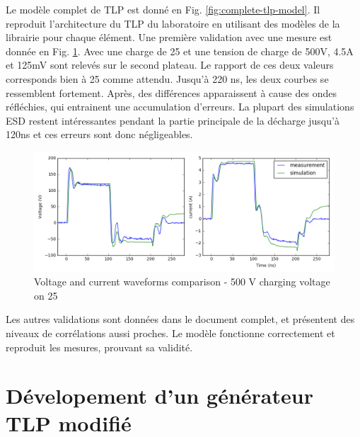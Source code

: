 Le modèle complet de TLP est donné en Fig. \ref{fig:complete-tlp-model}.
Il reproduit l'architecture du TLP du laboratoire en utilisant des modèles de la librairie pour chaque élément.
Une première validation avec une mesure est donnée en Fig. \ref{fig:comparison-tlp-load}.
Avec une charge de 25\textOmega{} et une tension de charge de 500V, 4.5A et 125mV sont relevés sur le second plateau.
Le rapport de ces deux valeurs corresponds bien à 25\textOmega{} comme attendu.
Jusqu'à 220 ns, les deux courbes se ressemblent fortement.
Après, des différences apparaissent à cause des ondes réfléchies, qui entrainent une accumulation d'erreurs.
La plupart des simulations ESD restent intéressantes pendant la partie principale de la décharge jusqu'à 120ns et ces erreurs sont donc négligeables.

\begin{figure}[!h]
  \centering
  \includegraphics[width=\textwidth]{src/1/figures/tlp_comparison_R25_500V.png}
  \caption{Voltage and current waveforms comparison - 500 V charging voltage on 25\textOmega{}}
  \label{fig:comparison-tlp-load}
\end{figure}

Les autres validations sont données dans le document complet, et présentent des niveaux de corrélations aussi proches.
Le modèle fonctionne correctement et reproduit les mesures, prouvant sa validité.

\section{Dévelopement d'un générateur TLP modifié}

